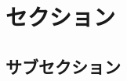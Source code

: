 \documentclass[a4j, 10pt]{jarticle}
\title{}
\author{}
\date{\today}
\begin{document}
  \section{セクション}
  \subsection{サブセクション}
\end{document}
